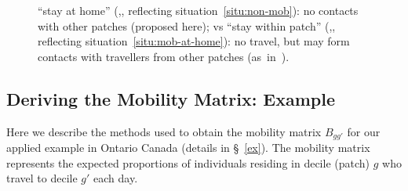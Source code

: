 \begin{figure}[ht]
{    ``stay at home'' (,,
    reflecting situation~\ref{situ:non-mob}):
    no contacts with other patches (proposed here); vs
    ``stay within patch'' (,,
    reflecting situation~\ref{situ:mob-at-home}):
    no travel, but may form contacts with travellers from other patches (as~in~\cite{Arenas2020}).}
  \label{fig:nm}
  \vspace{-5ex} %
\end{figure}
\clearpage
\subsection{Deriving the Mobility Matrix: Example}\label{app.mob}
Here we describe the methods used to obtain the mobility matrix $B_{gg'}$
for our applied example in Ontario Canada (details in \S~\ref{ex}).
The mobility matrix represents
the expected proportions of individuals residing in decile (patch) $g$ who travel to decile $g'$ each day.
